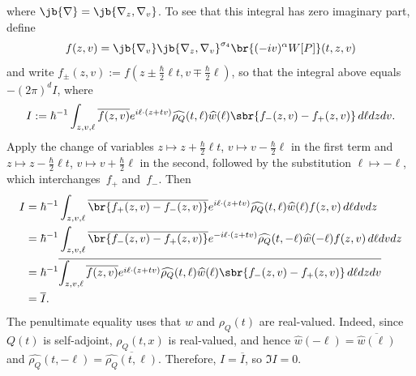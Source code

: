 where $\jb{\nabla}=\jb{\nabla_z,\nabla_v}$.
To see that this integral has zero imaginary part, define \[f(z,v)=\jb{\nabla_v}\jb{\nabla_z,\nabla_v}^{\sigma_4}\br{(-iv)^\alpha W[P]}(t,z,v)\] and write $f_\pm(z,v):=f(z\pm\tfrac{\hbar}{2}\ell t,v\mp\tfrac{\hbar}{2}\ell)$, so that the integral above equals $-(2\pi)^dI$, where
\begin{align*}
I:=\hbar^{-1}\int_{z,v,\ell }\overline{f(z,v)}e^{i\ell \cdot(z+tv)}\widehat{\rho_Q}(t,\ell )\widehat w(\ell )\sbr{f_-(z,v)-f_+(z,v)}\,d\ell dzdv.
\end{align*} Apply the change of variables \(z \mapsto z + \tfrac{\hbar}{2} \ell t\), \(v \mapsto v - \tfrac{\hbar}{2} \ell\) in the first term and \(z \mapsto z - \tfrac{\hbar}{2} \ell t\), \(v \mapsto v + \tfrac{\hbar}{2} \ell\) in the second, followed by the substitution $\ell\mapsto-\ell$, which interchanges~$f_+$ and~$f_-$. Then
\begin{align*}
I&=\hbar^{-1}\int_{z,v,\ell }\overline{\br{f_+(z,v)-f_-(z,v)}}e^{i\ell \cdot(z+tv)}\widehat{\rho_Q}(t,\ell )\widehat w(\ell )f(z,v)\,d\ell dvdz\\
&=\hbar^{-1}\int_{z,v,\ell }\overline{\br{f_-(z,v)-f_+(z,v)}}e^{-i\ell \cdot(z+tv)}\widehat{\rho_Q}(t,-\ell )\widehat w(-\ell )f(z,v)\,d\ell dvdz\\
&=\hbar^{-1}\overline{\int_{z,v,\ell }\overline{f(z,v)}e^{i\ell \cdot(z+tv)}\widehat{\rho_Q}(t,\ell )\widehat w(\ell )\sbr{f_-(z,v)-f_+(z,v)}\,d\ell dzdv}\\
&=\overline{I}.
\end{align*}
The penultimate equality uses that $w$ and $\rho_Q(t)$ are real-valued. Indeed, since $Q(t)$ is self-adjoint, $\rho_Q(t,x)$ is real-valued, and hence $\widehat w(-\ell)=\overline{\widehat w(\ell)}$ and $\widehat{\rho_Q}(t,-\ell)=\overline{\widehat{\rho_Q}(t,\ell)}$.
Therefore, $I=\overline I$, so $\Im I=0$.

